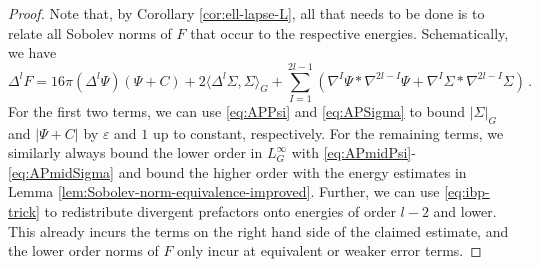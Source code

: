 \documentclass[11pt,leqno,textwidth=10cm]{amsart}
\numberwithin{equation}{section}
\theoremstyle{definition}
\theoremstyle{plain}
\newcommand{\1}{\mathbbm{1}}
\newcommand{\E}{\mathcal{E}}
\newcommand{\Ric}{\text{\normalfont{Ric}}}
\newcommand{\vol}[1]{{\text{\normalfont{vol}}}_{#1}}
\renewcommand{\epsilon}{\varepsilon}
\newcommand{\Lap}{\Delta}
\begin{document}
\begin{proof}
Note that, by Corollary \ref{cor:ell-lapse-L}, all that needs to be done is to relate all Sobolev norms of $F$ that occur to the respective energies. Schematically, we have
\[\Lap^{l}F=16\pi(\Lap^l\Psi)(\Psi+C)+2\langle\Lap^l\Sigma,\Sigma\rangle_G+\sum_{I=1}^{2l-1}\left(\nabla^I\Psi\ast\nabla^{2l-I}\Psi+\nabla^I\Sigma\ast\nabla^{2l-I}\Sigma\right)\,.\]
For the first two terms, we can use \eqref{eq:APPsi} and \eqref{eq:APSigma} to bound $\lvert\Sigma\rvert_G$ and $\lvert\Psi+C\rvert$ by $\epsilon$ and $1$ up to constant, respectively. For the remaining terms, we similarly always bound the lower order in $L^\infty_G$ with \eqref{eq:APmidPsi}-\eqref{eq:APmidSigma} and bound the higher order with the energy estimates in Lemma \ref{lem:Sobolev-norm-equivalence-improved}. Further, we can use \eqref{eq:ibp-trick} to redistribute divergent prefactors onto energies of order $l-2$ and lower. %
This already incurs the terms on the right hand side of the claimed estimate, and the lower order norms of $F$ only incur at equivalent or weaker error terms.

\end{proof}
\end{document}
